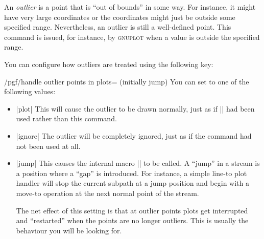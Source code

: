 \begin{command}{\pgfplotstreampointoutlier{}}
    An \emph{outlier} is a point that is ``out of bounds'' in some way. For
    instance, it might have very large coordinates or the coordinates might
    just be outside some specified range. Nevertheless, an outlier is still a
    well-defined point. This command is issued, for instance, by
    \textsc{gnuplot} when a value is outside the specified range.

    You can configure how outliers are treated using the following key:
    \begin{key}{/pgf/handle outlier points in plots= (initially jump)}
        You can set  to one of the following values:
        \begin{itemize}
            \item |plot| This will cause the outlier to be drawn normally, just
                as if |\pgfplotstreampoint| had been used rather than this
                command.
            \item |ignore| The outlier will be completely ignored, just as if
                the command had not been used at all.
            \item |jump| This causes the internal macro |\pgf@plotstreamjump|
                to be called. A ``jump'' in a stream is a position where a
                ``gap'' is introduced. For instance, a simple line-to plot
                handler will stop the current subpath at a jump position and
                begin with a move-to operation at the next normal point of the
                stream.

                The net effect of this setting is that at outlier points plots
                get interrupted and ``restarted'' when the points are no longer
                outliers. This is usually the behaviour you will be looking
                for.
        \end{itemize}
    \end{key}
\end{command}

